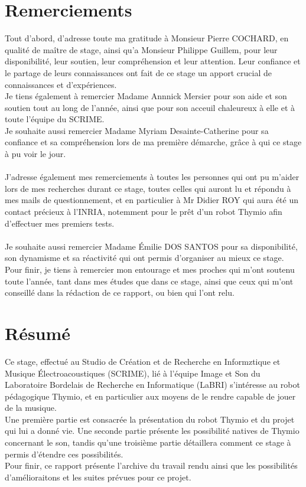 \documentclass[a4paper, 12pt]{report}
\begin{document}


\chapter*{Remerciements}

Tout d'abord, d'adresse toute ma gratitude à Monsieur Pierre COCHARD, en qualité de maître de stage, ainsi qu'a Monsieur Philippe Guillem, pour leur disponibilité, leur soutien, leur compréhension et leur attention. Leur confiance et le partage de leurs connaissances ont fait de ce stage un apport crucial de connaissances et d'expériences.\\

Je tiens également à remercier Madame Annnick Mersier pour son aide et son soutien tout au long de l'année, ainsi que pour son acceuil chaleureux à elle et à toute l'équipe du SCRIME.\\
Je souhaite aussi remercier Madame Myriam Desainte-Catherine pour sa confiance et sa compréhension lors de ma première démarche, grâce à qui ce stage à pu voir le jour.\\\\
J'adresse également mes remerciements à toutes les personnes qui ont pu m'aider lors de mes recherches durant ce stage, toutes celles qui auront lu et répondu à mes mails de questionnement, et en particulier à Mr Didier ROY qui aura été un contact précieux à l'INRIA, notemment pour le prêt d'un robot Thymio afin d'effectuer mes premiers tests.\\\\
Je souhaite aussi remercier Madame Émilie DOS SANTOS pour sa disponibilité, son dynamisme et sa réactivité qui ont permis d'organiser au mieux ce stage.\\

Pour finir, je tiens à remercier mon entourage et mes proches qui m'ont soutenu toute l'année, tant dans mes études que dans ce stage, ainsi que ceux qui m'ont conseillé dans la rédaction de ce rapport, ou bien qui l'ont relu.

\chapter*{Résumé}
	Ce stage, effectué au Studio de Création et de Recherche en Informztique et Musique Électroacoustiques (SCRIME), lié à l'équipe Image et Son du Laboratoire Bordelais de Recherche en Informatique (LaBRI) s'intéresse au robot pédagogique Thymio, et en particulier aux moyens de le rendre capable de jouer de la musique.\\
Une première partie est consacrée la présentation du robot Thymio et du projet qui lui a donné vie. Une seconde partie présente les possibilité natives de Thymio concernant le son, tandis qu'une troisième partie détaillera comment ce stage à permis d'étendre ces possibilités.\\
Pour finir, ce rapport présente l'archive du travail rendu ainsi que les possibilités d'amélioraitons et les suites prévues pour ce projet.
\end{document}
